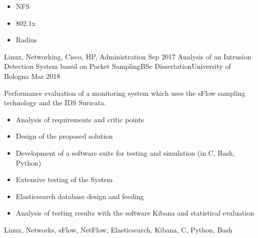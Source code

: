 \begin{experiences}
{\begin{itemize}
                        \item NFS
                        \item 802.1x
                        \item Radius
                      \end{itemize}
                    }
                    {Linux, Networking, Cisco, HP, Administration}
  \emptySeparator
  \experience
    {Sep 2017}   {Analysis of an Intrusion Detection System based on Packet Sampling}{BSc Dissertation}{University of Bologna}
    {Mar 2018} {
                      Performance evaluation of a monitoring system which uses the sFlow sampling technology  and the IDS Suricata.
                      \begin{itemize}
                        \item Analysis of requirements and critic points
                        \item Design of the proposed solution
                        \item Development of a software suite for testing and simulation (in C, Bash, Python)
                        \item Extensive testing of the System
                        \item Elasticsearch database design and feeding
                        \item Analysis of testing results with the software Kibana and statistical evaluation
                      \end{itemize}
                    }
                    {Linux, Networks, sFlow, NetFlow, Elasticsearch, Kibana, C, Python, Bash}
  \emptySeparator
\end{experiences}

